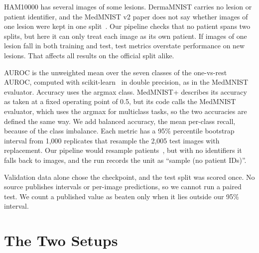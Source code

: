 \documentclass[conference]{IEEEtran}
\begin{document}
HAM10000 has several images of some lesions. DermaMNIST carries no lesion or patient identifier, and the MedMNIST v2 paper does not say whether images of one lesion were kept in one split~\cite{yang2023medmnistv2}. Our pipeline checks that no patient spans two splits, but here it can only treat each image as its own patient. If images of one lesion fall in both training and test, test metrics overstate performance on new lesions. That affects all results on the official split alike.

AUROC is the unweighted mean over the seven classes of the one-vs-rest AUROC, computed with scikit-learn~\cite{pedregosa2011sklearn} in double precision, as in the MedMNIST evaluator. Accuracy uses the argmax class. MedMNIST+ describes its accuracy as taken at a fixed operating point of 0.5, but its code calls the MedMNIST evaluator, which uses the argmax for multiclass tasks, so the two accuracies are defined the same way. We add balanced accuracy, the mean per-class recall, because of the class imbalance. Each metric has a 95\% percentile bootstrap interval from 1,000 replicates that resample the 2,005 test images with replacement. Our pipeline would resample patients~\cite{field2007bootstrap}, but with no identifiers it falls back to images, and the run records the unit as ``sample (no patient IDs)''.

Validation data alone chose the checkpoint, and the test split was scored once. No source publishes intervals or per-image predictions, so we cannot run a paired test. We count a published value as beaten only when it lies outside our 95\% interval.

\section{The Two Setups}
\end{document}
